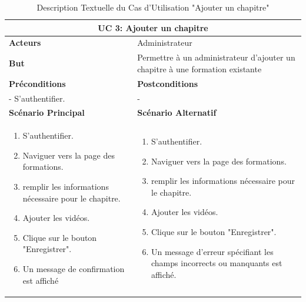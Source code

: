     
\begin{table}[h!]
    \centering
    \begin{tabular}{| m{7cm} | m{7cm} |}
    \hline
    \multicolumn{2}{|c|}{\textbf{UC 3:} Ajouter un chapitre} \\ \hline
    \textbf{Acteurs} &  Administrateur \\ \hline
    \textbf{But} &   Permettre à un administrateur d'ajouter un chapitre à une formation existante \\ \hline
     \textbf{Préconditions} 
    & 
    \textbf{Postconditions} \\ \hline
    - S'authentifier. & - \\ \hline
    \textbf{Scénario Principal} & \textbf{Scénario Alternatif}
    \\ \hline
    \begin{enumerate}
        \item S'authentifier.
        \item Naviguer vers la page des formations.
        \item remplir les informations nécessaire pour le chapitre.
        \item Ajouter les vidéos.
        \item Clique sur le bouton "Enregistrer".
        \item Un message de confirmation est affiché
    \end{enumerate} & 
    \begin{enumerate}
        \item S'authentifier.
        \item Naviguer vers la page des formations.
        \item remplir les informations nécessaire pour le chapitre.
        \item Ajouter les vidéos.
        \item Clique sur le bouton "Enregistrer".
        \item Un message d'erreur spécifiant les champs incorrects ou manquants est affiché.
    \end{enumerate}
    \\ \hline
    \end{tabular}
    \caption{Description Textuelle du Cas d'Utilisation "Ajouter un chapitre"}
    \label{tab:use_case_description}
    \end{table}


